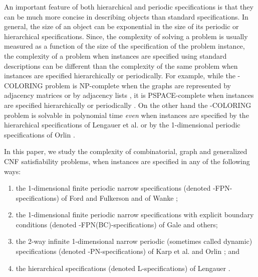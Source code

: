 An important feature of  both hierarchical and periodic 
specifications is that they
can be much  more concise in describing  objects than standard  specifications.
In general, the size of an object can be exponential in the
size of its periodic or hierarchical specifications.
Since, the  complexity of solving a problem 
is usually measured as a function of the size of the specification of the 
problem instance,  
the complexity of a problem when instances are specified using
standard descriptions can
be  different than the complexity of the same problem 
when instances are specified hierarchically or periodically.
For example, while the {-COLORING} problem is 
{\sf NP-}complete when the graphs are represented by adjacency matrices
or by adjacency lists \cite{GJ79}, it is 
{\sf PSPACE}-complete when instances are specified
hierarchically or periodically \cite{LW92,Or84b}.
On the other hand the {-COLORING} problem is solvable in polynomial time
{\em even} when instances are specified by the hierarchical
specifications of Lengauer et al. \cite{LW92,LW87a} or by  the 
1-dimensional periodic specifications of Orlin \cite{Or82a}.




In this paper, we study the complexity of combinatorial, graph and 
generalized {\sf CNF} satisfiability problems,
when instances are specified in any of the following ways:

\begin{enumerate}
\item
the 1-dimensional finite periodic narrow specifications (denoted 
{-FPN}-specifications) of Ford and Fulkerson \cite{FF58}
and of Wanke \cite{Wa93}; 
\item
the 1-dimensional finite periodic narrow specifications with explicit 
boundary conditions (denoted {-FPN(BC)}-specifications)
of Gale \cite{Ga59}
and others; 
\item
the 2-way infinite 1-dimensional narrow
periodic (sometimes called dynamic) specifications  (denoted
{-PN}-specifications) 
of Karp et al. and Orlin \cite{KMW67,Or82a}; and 
\item
the hierarchical specifications (denoted {\sf L}-specifications) of 
Lengauer \cite{LW87a}. 

\end{enumerate}


